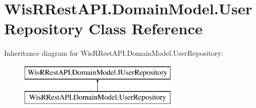 \hypertarget{class_wis_r_rest_a_p_i_1_1_domain_model_1_1_user_repository}{}\section{Wis\+R\+Rest\+A\+P\+I.\+Domain\+Model.\+User\+Repository Class Reference}
\label{class_wis_r_rest_a_p_i_1_1_domain_model_1_1_user_repository}
Inheritance diagram for Wis\+R\+Rest\+A\+P\+I.\+Domain\+Model.\+User\+Repository\+:\begin{figure}[H]
\begin{center}
\leavevmode
\includegraphics[height=2.000000cm]{class_wis_r_rest_a_p_i_1_1_domain_model_1_1_user_repository}
\end{center}
\end{figure}
